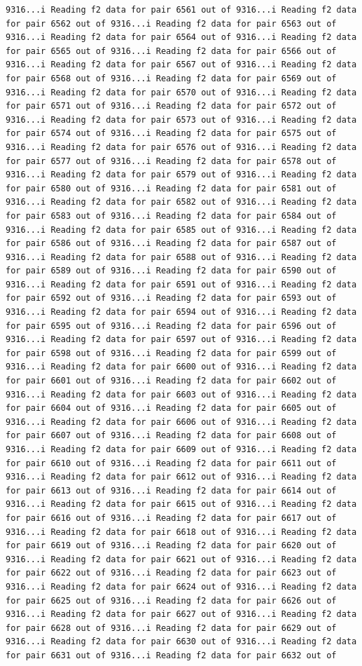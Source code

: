 \documentclass[
]{article}
\begin{document}
\begin{verbatim}
9316...i Reading f2 data for pair 6561 out of 9316...i Reading f2 data for pair 6562 out of 9316...i Reading f2 data for pair 6563 out of 9316...i Reading f2 data for pair 6564 out of 9316...i Reading f2 data for pair 6565 out of 9316...i Reading f2 data for pair 6566 out of 9316...i Reading f2 data for pair 6567 out of 9316...i Reading f2 data for pair 6568 out of 9316...i Reading f2 data for pair 6569 out of 9316...i Reading f2 data for pair 6570 out of 9316...i Reading f2 data for pair 6571 out of 9316...i Reading f2 data for pair 6572 out of 9316...i Reading f2 data for pair 6573 out of 9316...i Reading f2 data for pair 6574 out of 9316...i Reading f2 data for pair 6575 out of 9316...i Reading f2 data for pair 6576 out of 9316...i Reading f2 data for pair 6577 out of 9316...i Reading f2 data for pair 6578 out of 9316...i Reading f2 data for pair 6579 out of 9316...i Reading f2 data for pair 6580 out of 9316...i Reading f2 data for pair 6581 out of 9316...i Reading f2 data for pair 6582 out of 9316...i Reading f2 data for pair 6583 out of 9316...i Reading f2 data for pair 6584 out of 9316...i Reading f2 data for pair 6585 out of 9316...i Reading f2 data for pair 6586 out of 9316...i Reading f2 data for pair 6587 out of 9316...i Reading f2 data for pair 6588 out of 9316...i Reading f2 data for pair 6589 out of 9316...i Reading f2 data for pair 6590 out of 9316...i Reading f2 data for pair 6591 out of 9316...i Reading f2 data for pair 6592 out of 9316...i Reading f2 data for pair 6593 out of 9316...i Reading f2 data for pair 6594 out of 9316...i Reading f2 data for pair 6595 out of 9316...i Reading f2 data for pair 6596 out of 9316...i Reading f2 data for pair 6597 out of 9316...i Reading f2 data for pair 6598 out of 9316...i Reading f2 data for pair 6599 out of 9316...i Reading f2 data for pair 6600 out of 9316...i Reading f2 data for pair 6601 out of 9316...i Reading f2 data for pair 6602 out of 9316...i Reading f2 data for pair 6603 out of 9316...i Reading f2 data for pair 6604 out of 9316...i Reading f2 data for pair 6605 out of 9316...i Reading f2 data for pair 6606 out of 9316...i Reading f2 data for pair 6607 out of 9316...i Reading f2 data for pair 6608 out of 9316...i Reading f2 data for pair 6609 out of 9316...i Reading f2 data for pair 6610 out of 9316...i Reading f2 data for pair 6611 out of 9316...i Reading f2 data for pair 6612 out of 9316...i Reading f2 data for pair 6613 out of 9316...i Reading f2 data for pair 6614 out of 9316...i Reading f2 data for pair 6615 out of 9316...i Reading f2 data for pair 6616 out of 9316...i Reading f2 data for pair 6617 out of 9316...i Reading f2 data for pair 6618 out of 9316...i Reading f2 data for pair 6619 out of 9316...i Reading f2 data for pair 6620 out of 9316...i Reading f2 data for pair 6621 out of 9316...i Reading f2 data for pair 6622 out of 9316...i Reading f2 data for pair 6623 out of 9316...i Reading f2 data for pair 6624 out of 9316...i Reading f2 data for pair 6625 out of 9316...i Reading f2 data for pair 6626 out of 9316...i Reading f2 data for pair 6627 out of 9316...i Reading f2 data for pair 6628 out of 9316...i Reading f2 data for pair 6629 out of 9316...i Reading f2 data for pair 6630 out of 9316...i Reading f2 data for pair 6631 out of 9316...i Reading f2 data for pair 6632 out of 
\end{verbatim}
\end{document}
